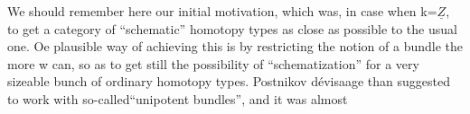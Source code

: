 We should remember here our initial motivation, which was, in
case when k=$\underline{Z}$, to get a category of  ``schematic'' homotopy
types as close as possible to the usual one. Oe plausible way of
achieving this is by restricting the notion of a bundle the more w
can, so as to get still the possibility of ``schematization'' for a very
sizeable bunch of ordinary homotopy types. Postnikov dévisaage than
suggested to work with so-called``unipotent bundles'', and it was almost


